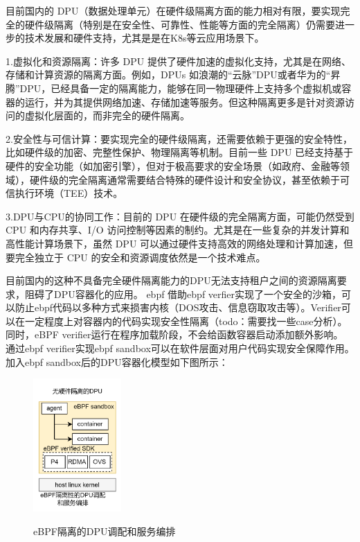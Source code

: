 目前国内的 DPU（数据处理单元）在硬件级隔离方面的能力相对有限，要实现完全的硬件级隔离（特别是在安全性、可靠性、性能等方面的完全隔离）仍需要进一步的技术发展和硬件支持，尤其是是在K8s等云应用场景下。

1.虚拟化和资源隔离：许多 DPU 提供了硬件加速的虚拟化支持，尤其是在网络、存储和计算资源的隔离方面。例如，DPUs 如浪潮的“云脉”DPU或者华为的“昇腾”DPU，已经具备一定的隔离能力，能够在同一物理硬件上支持多个虚拟机或容器的运行，并为其提供网络加速、存储加速等服务。但这种隔离更多是针对资源访问的虚拟化层面的，而非完全的硬件隔离。

2.安全性与可信计算：要实现完全的硬件级隔离，还需要依赖于更强的安全特性，比如硬件级的加密、完整性保护、物理隔离等机制。目前一些 DPU 已经支持基于硬件的安全功能（如加密引擎），但对于极高要求的安全场景（如政府、金融等领域），硬件级的完全隔离通常需要结合特殊的硬件设计和安全协议，甚至依赖于可信执行环境（TEE）技术。

3.DPU与CPU的协同工作：目前的 DPU 在硬件级的完全隔离方面，可能仍然受到 CPU 和内存共享、I/O 访问控制等因素的制约。尤其是在一些复杂的并发计算和高性能计算场景下，虽然 DPU 可以通过硬件支持高效的网络处理和计算加速，但要完全独立于 CPU 的安全和资源调度依然是一个技术难点。

目前国内的这种不具备完全硬件隔离能力的DPU无法支持租户之间的资源隔离要求，阻碍了DPU容器化的应用。
ebpf 借助ebpf verfier实现了一个安全的沙箱，可以防止ebpf代码以多种方式来损害内核（DOS攻击、信息窃取攻击等）。Verifier可以在一定程度上对容器内的代码实现安全性隔离（todo：需要找一些case分析）。同时，eBPF verifier运行在程序加载阶段，不会给函数容器启动添加额外影响。 通过ebpf verifier实现ebpf sandbox可以在软件层面对用户代码实现安全保障作用。加入ebpf sandbox后的DPU容器化模型如下图所示：

\captionsetup[figure]{justification=justified}
\begin{figure}
	\centering
		\includegraphics[width=0.3\textwidth]{figures/figure3}
 \label{fig:diagram2}
 \caption{eBPF隔离的DPU调配和服务编排}
 
\end{figure}

